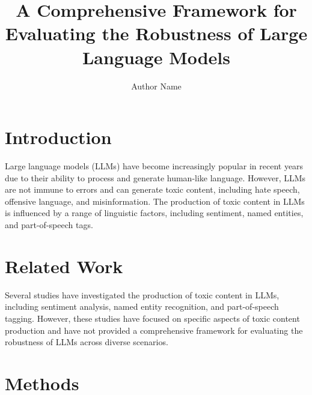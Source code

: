\documentclass{article}
\begin{document}
\title{A Comprehensive Framework for Evaluating the Robustness of Large Language Models}

\author{Author Name}

\maketitle


\section{Introduction}

Large language models (LLMs) have become increasingly popular in recent years due to their ability to process and generate human-like language. However, LLMs are not immune to errors and can generate toxic content, including hate speech, offensive language, and misinformation. The production of toxic content in LLMs is influenced by a range of linguistic factors, including sentiment, named entities, and part-of-speech tags.

\section{Related Work}

Several studies have investigated the production of toxic content in LLMs, including sentiment analysis, named entity recognition, and part-of-speech tagging. However, these studies have focused on specific aspects of toxic content production and have not provided a comprehensive framework for evaluating the robustness of LLMs across diverse scenarios.

\section{Methods}
\end{document}
